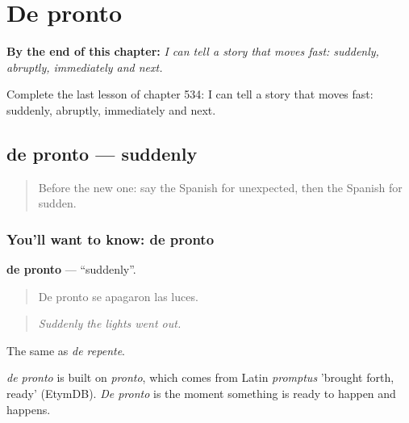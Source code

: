 
\chapter{De pronto}
\label{ch:es-de-pronto}

\begin{chapteropening}
\textbf{By the end of this chapter:} \emph{I can tell a story that moves fast: suddenly, abruptly, immediately and next.}

Complete the last lesson of chapter 534: I can tell a story that moves fast: suddenly, abruptly, immediately and next.
\end{chapteropening}

\section[de pronto]{de pronto — suddenly}

\label{lesson:ES-C534-de-pronto}



\begin{quote}
Before the new one: say the Spanish for unexpected, then the Spanish for sudden.
\end{quote}

\subsection*{You'll want to know: de pronto}
\textbf{de pronto} — \textquotedblleft{}suddenly\textquotedblright{}.

\begin{quote}
De pronto se apagaron las luces.
\end{quote}

\begin{quote}
\emph{Suddenly the lights went out.}
\end{quote}

The same as \emph{de repente}.

\begin{cousinweb}
\emph{de pronto} is built on \emph{pronto}, which comes from Latin \emph{promptus} 'brought forth, ready' (EtymDB). \emph{De pronto} is the moment something is ready to happen and happens.
\end{cousinweb}

